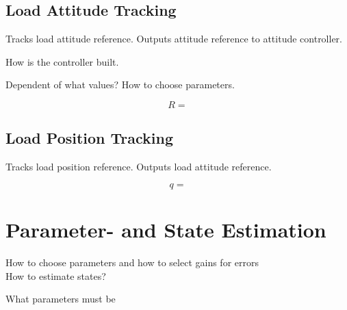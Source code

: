 \subsection{Load Attitude Tracking}

Tracks load attitude reference. Outputs attitude reference to attitude controller.
	
How is the controller built.

Dependent of what values? 	How to choose parameters.

\begin{figure}[h!]
	\centering
	\caption{\label{fig:con.loadattloop}}
\end{figure}		

\begin{equation}\label{key}
R = 
\end{equation}

\subsection{Load Position Tracking}

Tracks load position reference. Outputs load attitude reference.

\begin{equation}\label{key}
q =
\end{equation}

\begin{figure}[h!]
	\centering
	\caption{\label{fig:con.loadposloop}}
\end{figure}		

\section{Parameter- and State Estimation}

How to choose parameters and how to select gains for errors\\

How to estimate states?



What parameters must be 

